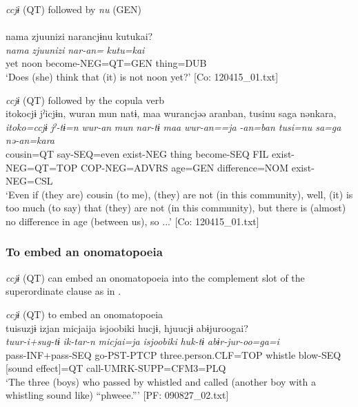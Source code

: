\ea\label{ex:10.72} 
\ea \textit{ccjɨ} (QT) followed by \textit{nu} (GEN)\\\\
      \glll    nama  {\textbar}zjuunizi{\textbar}  narancjɨnu  kutukai?\\
    \textit{nama}  \textit{zjuunizi}  \textit{nar-an=}  \textit{kutu=kai}\\
    yet  noon  become-NEG=QT=GEN  thing=DUB\\
\glt     ‘Does (she) think that (it) is not noon yet?’  [Co: 120415\_01.txt]

  \ex \textit{ccjɨ} (QT) followed by the copula verb\\
      \glll    {\textbar}itoko{\textbar}cjɨ  jˀicjɨn,  wuran  mun  natɨ,  {\textbar}maa{\textbar}   wurancjəə  aranban,  tusinu  {\textbar}sa{\textbar}ga  nənkara,\\
    \textit{itoko=ccjɨ}  \textit{jˀ-tɨ=n}  \textit{wur-an}  \textit{mun}  \textit{nar-tɨ}  \textit{maa} \textit{wur-an==ja}  \textit{-an=ban  tusi=nu  sa=ga  nə-an=kara}\\
    cousin=QT  say-SEQ=even  exist-NEG  thing  become-SEQ  FIL exist-NEG=QT=TOP  COP-NEG=ADVRS  age=GEN  difference=NOM  exist-NEG=CSL\\
\glt     ‘Even if (they are) cousin (to me), (they) are not (in this community), well, (it) is too much (to say) that (they) are not (in this community), but there is (almost) no difference in age (between us), so ...’  [Co: 120415\_01.txt]
\z
\z

\subsubsection{To embed an onomatopoeia}\label{sec:10.4.1.6}

\textit{ccjɨ} (QT) can embed an onomatopoeia into the complement slot of the superordinate clause as in .

\ea\label{ex:10.73}   \textit{ccjɨ} (QT) to embed an onomatopoeia\\
      \glll    tuisuzjɨ  izjan  micjaija  isjoobiki  hucjɨ,  hjuucjɨ  abɨjuroogai?\\
    \textit{tuur-i+sug-tɨ}  \textit{ik-tar-n}  \textit{micjai=ja}  \textit{isjoobiki}  \textit{huk-tɨ}  \textit{}  \textit{abɨr-jur-oo=ga=i}\\
    pass-INF+pass-SEQ  go-PST-PTCP  three.person.CLF=TOP  whistle  blow-SEQ  [sound effect]=QT  call-UMRK-SUPP=CFM3=PLQ\\
    \glt     ‘The three (boys) who passed by whistled and called (another boy with a whistling sound like) “phweee.”’ [PF: 090827\_02.txt]
    \z


